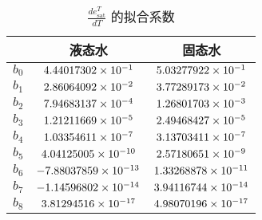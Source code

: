 \begin{table}[htbp]
  \centering
  \caption{$\frac{d e_{\mathrm{sat}}^T}{d T}$ 的拟合系数}
  \label{tab:de_sat_dT的拟合系数}
  \begin{tabular}{@{}lcc@{}}
    \toprule
          & 液态水                            & 固态水                           \\ \midrule
    $b_0$ & $\rm 4.44017302 \times 10^{-1}$   & $\rm 5.03277922 \times 10^{-1}$  \\
    $b_1$ & $\rm 2.86064092 \times 10^{-2}$   & $\rm 3.77289173 \times 10^{-2}$  \\
    $b_2$ & $\rm 7.94683137 \times 10^{-4}$   & $\rm 1.26801703 \times 10^{-3}$  \\
    $b_3$ & $\rm 1.21211669 \times 10^{-5}$   & $\rm 2.49468427 \times 10^{-5}$  \\
    $b_4$ & $\rm 1.03354611 \times 10^{-7}$   & $\rm 3.13703411 \times 10^{-7}$  \\
    $b_5$ & $\rm 4.04125005 \times 10^{-10}$  & $\rm 2.57180651 \times 10^{-9}$  \\
    $b_6$ & $\rm -7.88037859 \times 10^{-13}$ & $\rm 1.33268878 \times 10^{-11}$ \\
    $b_7$ & $\rm -1.14596802 \times 10^{-14}$ & $\rm 3.94116744 \times 10^{-14}$ \\
    $b_8$ & $\rm 3.81294516 \times 10^{-17}$  & $\rm 4.98070196 \times 10^{-17}$ \\ \bottomrule
  \end{tabular}
\end{table}

